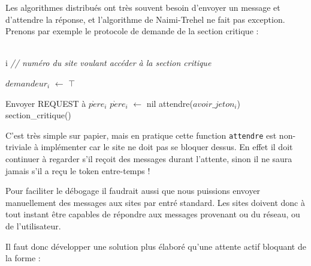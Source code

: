Les algorithmes distribués ont très souvent besoin d'envoyer un message et d'attendre la réponse, et l'algorithme de Naimi-Trehel ne fait pas exception. Prenons par exemple le protocole de demande de la section critique :

\begin{algorithm}[H]
  \caption{$Supplier_i$()}
  \label{nt_wait}
  \Donnees
  {\\
    i \textit{// numéro du site voulant accéder à la section critique}\\
  }
  \Deb
  {
  	$demandeur_i$ $\leftarrow$ $\top$ \;
  	
  	{
  		Envoyer REQUEST à $p\grave{e}re_i$ \;
  		$p\grave{e}re_i$ $\leftarrow$ nil \;
  	}
	attendre($avoir\_jeton_i$) \;
  	section\_critique() \;

  }	
\end{algorithm}

C'est très simple sur papier, mais en pratique cette function \texttt{attendre} est non-triviale à implémenter car le site ne doit pas se bloquer dessus. En effet il doit continuer à regarder s'il reçoit des messages durant l'attente, sinon il ne saura jamais s'il a reçu le token entre-temps !

Pour faciliter le débogage il faudrait aussi que nous puissions envoyer manuellement des messages aux sites par entré standard. Les sites doivent donc à tout instant être capables de répondre aux messages provenant ou du réseau, ou de l'utilisateur.
 
Il faut donc développer une solution plus élaboré qu'une attente actif bloquant de la forme :

 